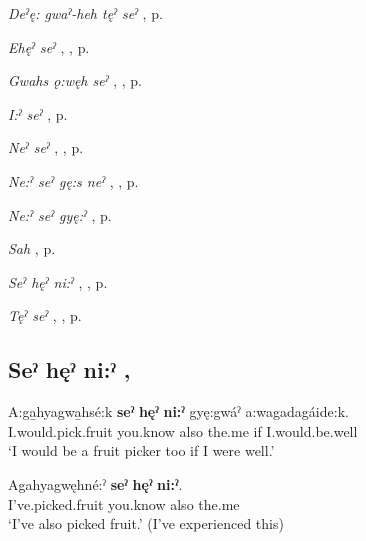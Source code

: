 \begin{CayugaRelated}
\item \textit{Deˀę: gwaˀ-heh tęˀ seˀ} , p. \pageref{p:[deˀę: gwaˀ-heh tęˀ seˀ]}\\
\item \textit{Ehęˀ seˀ} , , p. \pageref{p:[ęhęˀ seˀ]}\\
\item \textit{Gwahs ǫ:węh seˀ} , , p. \pageref{p:[gwahs ǫ:węh seˀ]}\\
\item \textit{I:ˀ seˀ} , p. \pageref{p:[i:ˀ seˀ]}\\
\item \textit{Neˀ seˀ} , , p. \pageref{p:[neˀ seˀ]}\\
\item \textit{Ne:ˀ seˀ gę:s neˀ} , , p. \pageref{p:[ne:ˀ seˀ gę:s neˀ]}\\
\item \textit{Ne:ˀ seˀ gyę:ˀ} , p. \pageref{p:[ne:ˀ seˀ gyę:ˀ]}\\
\item \textit{Sah} , p. \pageref{p:[sah]}\\
\item \textit{Seˀ hęˀ ni:ˀ} , , p. \pageref{p:[seˀ hęˀ ni:ˀ]}\\
\item \textit{Tęˀ seˀ} , , p. \pageref{p:[tęˀ seˀ]}
\end{CayugaRelated}

\subsection*{\textbf{Seˀ hęˀ ni:ˀ} , } \label{p:[seˀ hęˀ ni:ˀ]}

\ea
\label{ex:spart2}
\gll A:ga̱hyagwa̱hsé:k \textbf{seˀ} \textbf{hęˀ} \textbf{ni:ˀ} gyę:gwáˀ a:wagadagáide:k.\\
I.would.pick.fruit you.know also the.me if I.would.be.well\\
\glt ‘I would be a fruit picker too if I were well.’
\z

\ea
\label{ex:spart3}
\gll Agahyagwęhné:ˀ \textbf{seˀ} \textbf{hęˀ} \textbf{ni:ˀ}.\\
I’ve.picked.fruit you.know also the.me\\
\glt ‘I’ve also picked fruit.’ (I’ve experienced this)
\z

